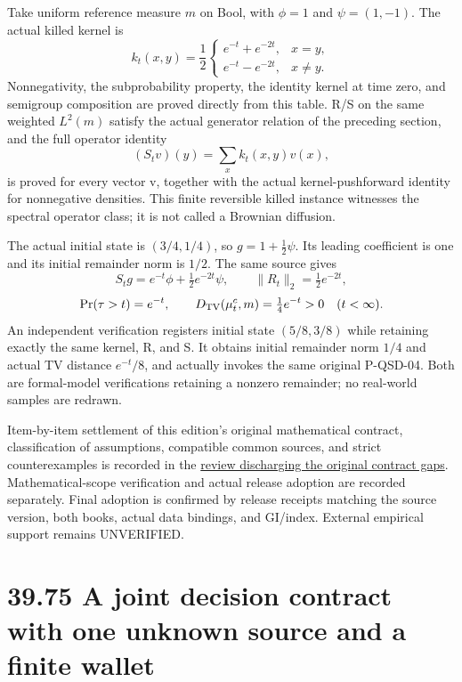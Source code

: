 \documentclass[
  english,
  11pt,
  oneside]{book}
\begin{document}
Take uniform reference measure \(m\) on Bool, with \(\phi=1\) and \(\psi=(1,-1)\). The actual killed kernel is \[k_t(x,y)=\frac12\begin{cases}
 e^{-t}+e^{-2t},&x=y,\\
 e^{-t}-e^{-2t},&x\ne y.
\end{cases}\] Nonnegativity, the subprobability property, the identity kernel at time zero, and semigroup composition are proved directly from this table. R/S on the same weighted \(L^2(m)\) satisfy the actual generator relation of the preceding section, and the full operator identity \[(S_tv)(y)=\sum_x k_t(x,y)v(x),\] is proved for every vector v, together with the actual kernel-pushforward identity for nonnegative densities. This finite reversible killed instance witnesses the spectral operator class; it is not called a Brownian diffusion.

The actual initial state is \((3/4,1/4)\), so \(g=1+\frac12\psi\). Its leading coefficient is one and its initial remainder norm is \(1/2\). The same source gives \[S_tg=e^{-t}\phi+\tfrac12e^{-2t}\psi,\qquad
\|R_t\|_2=\tfrac12e^{-2t},\] \[\Pr(\tau>t)=e^{-t},\qquad
D_{\rm TV}(\mu_t^c,m)=\tfrac14e^{-t}>0\quad(t<\infty).\] An independent verification registers initial state \((5/8,3/8)\) while retaining exactly the same kernel, R, and S. It obtains initial remainder norm \(1/4\) and actual TV distance \(e^{-t}/8\), and actually invokes the same original P-QSD-04. Both are formal-model verifications retaining a nonzero remainder; no real-world samples are redrawn.

Item-by-item settlement of this edition's original mathematical contract, classification of assumptions, compatible common sources, and strict counterexamples is recorded in the \href{../formalization/ueot-core/docs/compression/theory_completion/unified_closure/general_perron_compact_spectral_source_v1/independent/ueot-original-contract-general-gaps-discharge-review-20261103.json}{review discharging the original contract gaps}. Mathematical-scope verification and actual release adoption are recorded separately. Final adoption is confirmed by release receipts matching the source version, both books, actual data bindings, and GI/index. External empirical support remains UNVERIFIED.

\section{39.75 A joint decision contract with one unknown source and a finite wallet}\label{a-joint-decision-contract-with-one-unknown-source-and-a-finite-wallet}
\end{document}
